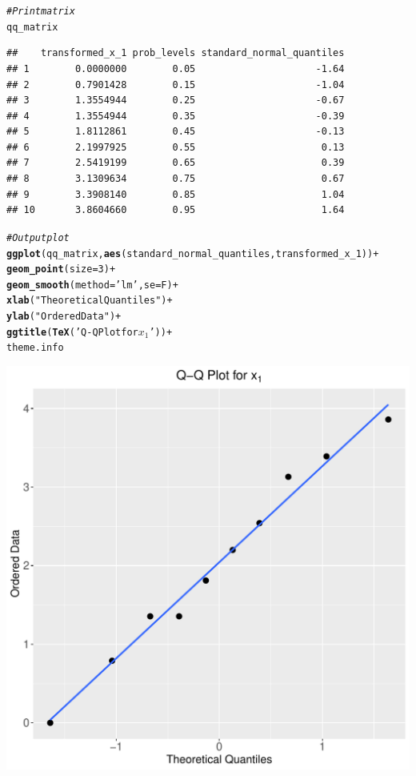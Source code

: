 \documentclass[12pt]{article}\usepackage[]{graphicx}\usepackage[]{color}
\makeatletter
\def\maxwidth{ %
  \ifdim\Gin@nat@width>\linewidth
    \linewidth
  \else
    \Gin@nat@width
  \fi
}
\newcommand{\hlnum}[1]{\textcolor[rgb]{0.686,0.059,0.569}{#1}}%
\newcommand{\hlstr}[1]{\textcolor[rgb]{0.192,0.494,0.8}{#1}}%
\newcommand{\hlcom}[1]{\textcolor[rgb]{0.678,0.584,0.686}{\textit{#1}}}%
\newcommand{\hlopt}[1]{\textcolor[rgb]{0,0,0}{#1}}%
\newcommand{\hlstd}[1]{\textcolor[rgb]{0.345,0.345,0.345}{#1}}%
\newcommand{\hlkwc}[1]{\textcolor[rgb]{0.333,0.667,0.333}{#1}}%
\newcommand{\hlkwd}[1]{\textcolor[rgb]{0.737,0.353,0.396}{\textbf{#1}}}%
\newenvironment{kframe}{%
 \def\at@end@of@kframe{}%
 \ifinner\ifhmode%
  \def\at@end@of@kframe{\end{minipage}}%
  \begin{minipage}{\columnwidth}%
 \fi\fi%
 \def\FrameCommand##1{\hskip\@totalleftmargin \hskip-\fboxsep
 \colorbox{shadecolor}{##1}\hskip-\fboxsep
     \hskip-\linewidth \hskip-\@totalleftmargin \hskip\columnwidth}%
 \MakeFramed {\advance\hsize-\width
   \@totalleftmargin\z@ \linewidth\hsize
   \@setminipage}}%
 {\par\unskip\endMakeFramed%
 \at@end@of@kframe}
\newenvironment{knitrout}{}{} %
\makeatother
\begin{document}
\begin{enumerate}[a)]
\begin{knitrout}
\begin{kframe}
\begin{alltt}
\hlcom{#Print matrix}
\hlstd{qq_matrix}
\end{alltt}
\begin{verbatim}
##    transformed_x_1 prob_levels standard_normal_quantiles
## 1        0.0000000        0.05                     -1.64
## 2        0.7901428        0.15                     -1.04
## 3        1.3554944        0.25                     -0.67
## 4        1.3554944        0.35                     -0.39
## 5        1.8112861        0.45                     -0.13
## 6        2.1997925        0.55                      0.13
## 7        2.5419199        0.65                      0.39
## 8        3.1309634        0.75                      0.67
## 9        3.3908140        0.85                      1.04
## 10       3.8604660        0.95                      1.64
\end{verbatim}
\begin{alltt}
\hlcom{#Output plot}
\hlkwd{ggplot}\hlstd{(qq_matrix,} \hlkwd{aes}\hlstd{(standard_normal_quantiles, transformed_x_1))} \hlopt{+}
  \hlkwd{geom_point}\hlstd{(}\hlkwc{size}\hlstd{=}\hlnum{3}\hlstd{)} \hlopt{+}
  \hlkwd{geom_smooth}\hlstd{(}\hlkwc{method}\hlstd{=}\hlstr{'lm'}\hlstd{,} \hlkwc{se}\hlstd{=F)} \hlopt{+}
  \hlkwd{xlab}\hlstd{(}\hlstr{"Theoretical Quantiles"}\hlstd{)} \hlopt{+}
  \hlkwd{ylab}\hlstd{(}\hlstr{"Ordered Data"}\hlstd{)} \hlopt{+}
  \hlkwd{ggtitle}\hlstd{(}\hlkwd{TeX}\hlstd{(}\hlstr{'Q-Q Plot for $x_1$'}\hlstd{))} \hlopt{+}
  \hlstd{theme.info}
\end{alltt}
\end{kframe}
\includegraphics[width=\maxwidth]{figure/unnamed-chunk-12-1} 


\end{knitrout}
\end{enumerate}
\end{document}
